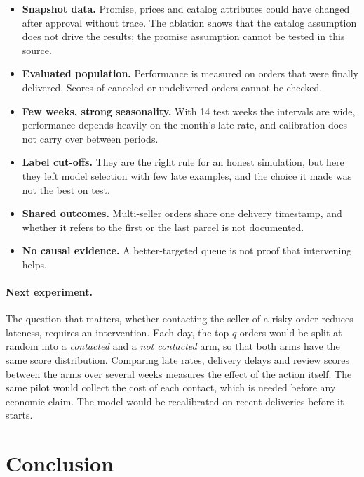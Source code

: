 \documentclass[10pt,twocolumn]{article}
\begin{document}
\begin{itemize}
\item \textbf{Snapshot data.} Promise, prices and catalog attributes could have changed after approval
      without trace. The ablation shows that the catalog assumption does not drive the results;
      the promise assumption cannot be tested in this source.
\item \textbf{Evaluated population.} Performance is measured on orders that were finally delivered.
      Scores of canceled or undelivered orders cannot be checked.
\item \textbf{Few weeks, strong seasonality.} With 14 test weeks the intervals are wide, performance
      depends heavily on the month's late rate, and calibration does not carry over between periods.
\item \textbf{Label cut-offs.} They are the right rule for an honest simulation, but here they left
      model selection with few late examples, and the choice it made was not the best on test.
\item \textbf{Shared outcomes.} Multi-seller orders share one delivery timestamp, and whether it refers
      to the first or the last parcel is not documented.
\item \textbf{No causal evidence.} A better-targeted queue is not proof that intervening helps.
\end{itemize}

\paragraph{Next experiment.} The question that matters, whether contacting the seller of a risky order
reduces lateness, requires an intervention. Each day, the top-$q$ orders would be split at random into
a \emph{contacted} and a \emph{not contacted} arm, so that both arms have the same score distribution.
Comparing late rates, delivery delays and review scores between the arms over several weeks measures
the effect of the action itself. The same pilot would collect the cost of each contact, which is needed
before any economic claim. The model would be recalibrated on recent deliveries before it starts.

\section{Conclusion}
\end{document}
